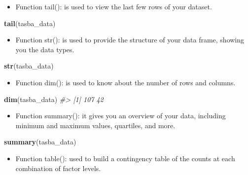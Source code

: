 \documentclass[
]{book}
\newenvironment{Shaded}{\begin{snugshade}}{\end{snugshade}}
\newcommand{\CommentTok}[1]{\textcolor[rgb]{0.56,0.35,0.01}{\textit{#1}}}
\newcommand{\FunctionTok}[1]{\textcolor[rgb]{0.13,0.29,0.53}{\textbf{#1}}}
\newcommand{\NormalTok}[1]{#1}
\providecommand{\tightlist}{%
  \setlength{\itemsep}{0pt}\setlength{\parskip}{0pt}}
\begin{document}
\begin{itemize}
\tightlist
\item
  Function tail(): is used to view the last few rows of your dataset.
\end{itemize}

\begin{Shaded}
\begin{Highlighting}[]
\FunctionTok{tail}\NormalTok{(tasba\_data)}
\end{Highlighting}
\end{Shaded}

\begin{itemize}
\tightlist
\item
  Function str(): is used to provide the structure of your data frame, showing you the data types.
\end{itemize}

\begin{Shaded}
\begin{Highlighting}[]
\FunctionTok{str}\NormalTok{(tasba\_data)}
\end{Highlighting}
\end{Shaded}

\begin{itemize}
\tightlist
\item
  Function dim(): is used to know about the number of rows and columns.
\end{itemize}

\begin{Shaded}
\begin{Highlighting}[]
\FunctionTok{dim}\NormalTok{(tasba\_data)}
\CommentTok{\#\textgreater{} [1] 107  42}
\end{Highlighting}
\end{Shaded}

\begin{itemize}
\tightlist
\item
  Function summary(): it gives you an overview of your data, including minimum and maximum values, quartiles, and more.
\end{itemize}

\begin{Shaded}
\begin{Highlighting}[]
\FunctionTok{summary}\NormalTok{(tasba\_data)}
\end{Highlighting}
\end{Shaded}

\begin{itemize}
\tightlist
\item
  Function table(): used to build a contingency table of the counts at each combination of factor levels.
\end{itemize}
\end{document}
